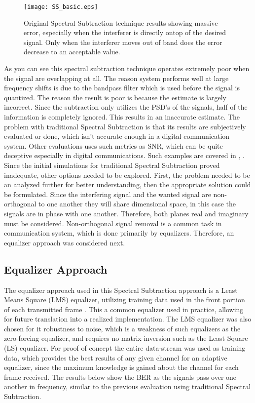 \begin{figure}
\centering
\texttt{[image: SS\_basic.eps]}
\caption{Original Spectral Subtraction technique results showing massive error, especially when the interferer is directly ontop of the desired signal.  Only when the interferer moves out of band does the error decrease to an acceptable value.}
\label{SS_basic}
\end{figure} 

As you can see this spectral subtraction technique operates extremely poor when the signal are overlapping at all.  The reason system performs well at large frequency shifts is due to the bandpass filter which is used before the signal is quantized.  The reason the result is poor is because the estimate is largely incorrect.  Since the subtraction only utilizes the PSD's of the signals, half of the information is completely ignored.  This results in an inaccurate estimate.  The problem with traditional Spectral Subtraction is that its results are subjectively evaluated or done, which isn't accurate enough in a digital communication system.  Other evaluations uses such metrics as SNR, which can be quite deceptive especially in digital communications.  Such examples are covered in \cite{ss_subjective1}, \cite{ss_subjective2}. \\

Since the initial simulations for traditional Spectral Subtraction proved inadequate, other options needed to be explored.  First, the problem needed to be an analyzed further for better understanding, then the appropriate solution could be formulated.  Since the interfering signal and the wanted signal are non-orthogonal to one another they will share dimensional space, in this case the signals are in phase with one another.  Therefore, both planes real and imaginary must be considered.  Non-orthogonal signal removal is a common task in communication system, which is done primarily by equalizers.  Therefore, an equalizer approach was considered next.\\

\subsection{Equalizer Approach}

The equalizer approach used in this Spectral Subtraction approach is a Least Means Square (LMS) equalizer, utilizing training data used in the front portion of each transmitted frame \cite{9}.  This a common equalizer used in practice, allowing for future translation into a realized implementation.  The LMS equalizer was also chosen for it robustness to noise, which is a weakness of such equalizers as the zero-forcing equalizer, and requires no matrix inversion such as the Least Square (LS) equalizer.  For proof of concept the entire data-stream was used as training data, which provides the best results of any given channel for an adaptive equalizer, since the maximum knowledge is gained about the channel for each frame received.  The results below show the BER as the signals pass over one another in frequency, similar to the previous evaluation using traditional Spectral Subtraction.\\
  
